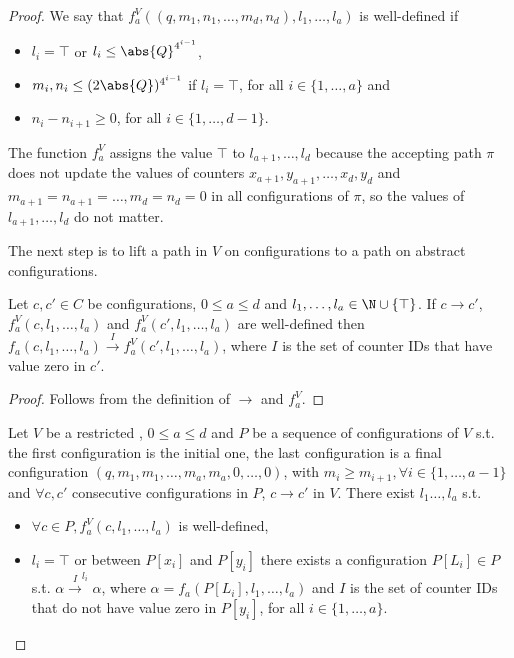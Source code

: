 \begin{proof}
We say that $f_a^V((q,m_1,n_1,\dots,m_d,n_d),l_1,\dots,l_a)$ is well-defined if 
\begin{itemize}
    \item $l_i=\top$ or $l_i\leq\abs{Q}^{4^{i-1}}$,
    \item $m_i,n_i\leq (2\abs{Q})^{4^{i-1}}$ if $l_i=\top$, for all $i\in\{1,\dots,a\}$ and
    \item $n_{i}-n_{i+1}\geq 0$, for all $i\in\{1,\dots,d-1\}$.
\end{itemize}

The function $f_a^V$ assigns the value $\top$ to $l_{a+1},\dots,l_d$ because the accepting path $\pi$ does not update the values of counters $x_{a+1},y_{a+1},\dots,x_d,y_d$ and $m_{a+1}=n_{a+1}=\dots,m_d=n_d=0$ in all configurations of $\pi$, so the values of $l_{a+1},\dots,l_d$ do not matter. 

The next step is to lift a path in $V$ on configurations to a path on abstract configurations. 

\begin{lemma}
\label{lm:path}
Let $c,c'\in C$ be configurations, $0\leq a\leq d$ and $l_1,\dots,l_a\in\N\cup\{\top\}$. If $c\xrightarrow{} c'$, $f_a^V(c,l_1,\dots,l_a)$ and $f_a^V(c',l_1,\dots,l_a)$ are well-defined then $f_a(c,l_1,\dots,l_a)\xrightarrow{I} f_a^V(c',l_1,\dots,l_a)$, where $I$ is the set of counter IDs that have value zero in $c'$.
\end{lemma}

\begin{proof}
Follows from the definition of $\xrightarrow{}$ and $f_a^V$.
\end{proof}

\begin{theorem}
\label{th:ls}
Let $V$ be a restricted \laVASS, $0\leq a\leq d$ and $P$ be a sequence of configurations of $V$ s.t. the first configuration is the initial one, the last configuration is a final configuration $(q,m_1,m_1,\dots,m_a,m_a,0,\dots,0)$, with $m_i\geq m_{i+1},\forall i\in\{1,\dots,a-1\}$ and $\forall c,c'$ consecutive configurations in $P$, $c\xrightarrow{}c'$ in $V$. There exist $l_1\dots,l_a$ s.t.
\begin{itemize}
    \item $\forall c\in P,f_a^V(c,l_1,\dots,l_a)$ is well-defined,
    \item $l_i=\top$ or between $P[x_i]$ and $P[y_i]$ there exists a configuration $P[L_i]\in P$ s.t. $\alpha\xrightarrow{I}^{l_i}\alpha$, where $\alpha=f_a(P[L_i],l_1,\dots,l_a)$ and $I$ is the set of counter IDs that do not have value zero in $P[y_i]$, for all $i\in\{1,\dots,a\}$.
\end{itemize}
\end{theorem}


\end{proof}
